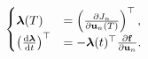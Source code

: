 \begin{align}
	\begin{cases}
	\boldsymbol{\lambda}(T) &= \left(\frac{\partial J_n}{\partial {\bf u}_n(T)}\right)^\top, \\
	 	\left(\frac{{\rm d} \boldsymbol{\lambda}}{{\rm d} t}\right)^\top& = - \boldsymbol{\lambda}(t)^\top \frac{\partial {\bf f}}{\partial {\bf u}_n}. \label{eq:adjoint-ode}
\end{cases}
\end{align}

